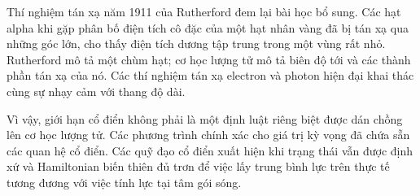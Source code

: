 Thí nghiệm tán xạ năm 1911 của Rutherford đem lại bài học bổ sung. Các hạt alpha khi gặp phân bố điện tích cô đặc của một hạt nhân vàng đã bị tán xạ qua những góc lớn, cho thấy điện tích dương tập trung trong một vùng rất nhỏ. Rutherford mô tả một chùm hạt; cơ học lượng tử mô tả biên độ tới và các thành phần tán xạ của nó. Các thí nghiệm tán xạ electron và photon hiện đại khai thác cùng sự nhạy cảm với thang độ dài.

\begin{classroomqa}
\end{classroomqa}

Vì vậy, giới hạn cổ điển không phải là một định luật riêng biệt được dán chồng lên cơ học lượng tử. Các phương trình chính xác cho giá trị kỳ vọng đã chứa sẵn các quan hệ cổ điển. Các quỹ đạo cổ điển xuất hiện khi trạng thái vẫn được định xứ và Hamiltonian biến thiên đủ trơn để việc lấy trung bình lực trên thực tế tương đương với việc tính lực tại tâm gói sóng.